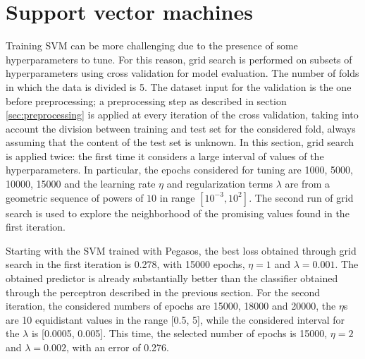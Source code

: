 \documentclass{article}
\begin{document}
\section{Support vector machines}
Training SVM can be more challenging due to the presence of some hyperparameters to tune.
For this reason, grid search is performed on subsets of hyperparameters using cross validation for model evaluation. The number of folds in which the data is divided is 5. 
The dataset input for the validation is the one before preprocessing; a preprocessing step as described in section \ref{sec:preprocessing} is applied at every iteration of the cross validation, taking into account the division between training and test set for the considered fold, always assuming that the content of the test set is unknown. 
In this section, grid search is applied twice: the first time it considers a large interval of values of the hyperparameters. In particular, the epochs considered for tuning are 1000, 5000, 10000, 15000 and the learning rate $\eta$ and regularization terms $\lambda$ are from a geometric sequence of powers of $10$ in range $[10^{-3}, 10^2]$. 
The second run of grid search is used to explore the neighborhood of the promising values found in the first iteration.

Starting with the SVM trained with Pegasos, the best loss obtained through grid search in the first iteration is 0.278, with 15000 epochs, $\eta=1$ and $\lambda=0.001$. 
The obtained predictor is already substantially better than the classifier obtained through the perceptron described in the previous section. 
For the second iteration, the considered numbers of epochs are 15000, 18000 and 20000, the $\eta$s are 10 equidistant values in the range [0.5, 5], while the considered interval for the $\lambda$ is [0.0005, 0.005]. 
This time, the selected number of epochs is 15000, $\eta=2$ and $\lambda=0.002$, with an error of 0.276.
\end{document}
